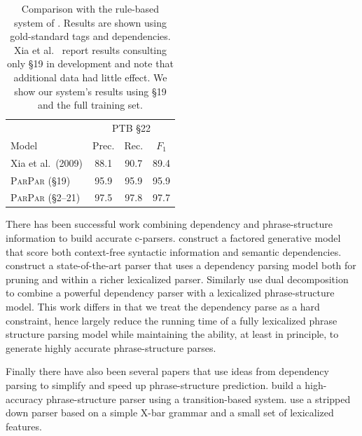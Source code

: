 \documentclass[11pt,letterpaper]{article}
\newcommand{\ParseName}{\textsc{ParPar}\xspace}
\begin{document}
\begin{table}
  \centering
  \small
  \begin{tabular}{|l|ccc|}

    \hline
    & \multicolumn{3}{|c|}{PTB \S 22} \\
    Model & Prec. & Rec. & $F_1$  \\
    \hline

    \hline
    Xia et al.~(2009)    & 88.1 & 90.7 & 89.4 \\
    \ParseName{} (\S 19)  & 95.9 & 95.9 & 95.9    \\
    \ParseName{}  (\S 2--21) & 97.5 & 97.8 & 97.7    \\
    \hline

  \end{tabular}
  \caption{Comparison with the rule-based system of .
    Results are shown using gold-standard tags and
    dependencies.  Xia et al.~
 report results consulting only \S 19 in development and
note that additional data had little effect.  We show our system's
results using \S 19 and the full training set. 
  \label{tab:convert}}
\end{table}



There has been successful work combining dependency and
phrase-structure information to build accurate c-parsers.
 construct a factored generative model that
score both context-free syntactic information and semantic
dependencies.   construct a state-of-the-art
parser that uses a dependency parsing model both for pruning and
within a richer lexicalized parser. Similarly 
use dual decomposition to combine a powerful dependency parser with a
lexicalized phrase-structure model. This work differs in that we treat the
dependency parse as a hard constraint, hence largely reduce the
running time of a fully lexicalized phrase structure parsing model
while maintaining the ability, at least in principle, to generate
highly accurate phrase-structure parses.




Finally there have also been several papers that use ideas from
dependency parsing to simplify and speed up phrase-structure prediction.
 build a high-accuracy phrase-structure parser
using a transition-based system.  use a stripped
down parser based on a simple X-bar grammar and a small set of lexicalized features.
\end{document}
